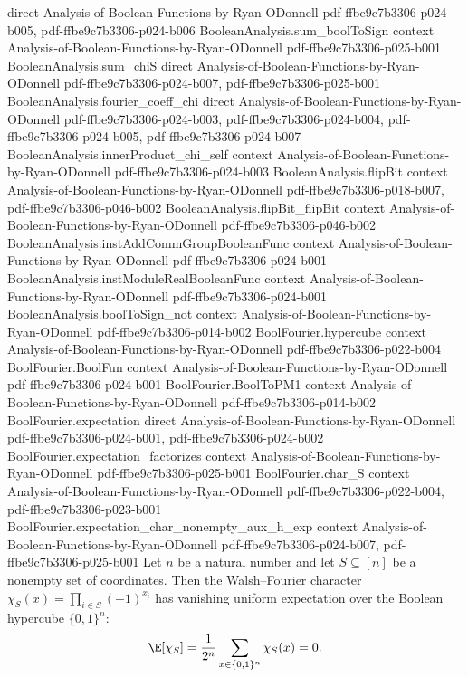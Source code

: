 \begin{lemma}
  {direct}
  {Analysis-of-Boolean-Functions-by-Ryan-ODonnell}
  {pdf-ffbe9c7b3306-p024-b005,
    pdf-ffbe9c7b3306-p024-b006}
\proofstep
  {BooleanAnalysis.sum_boolToSign}
  {context}
  {Analysis-of-Boolean-Functions-by-Ryan-ODonnell}
  {pdf-ffbe9c7b3306-p025-b001}
\proofstep
  {BooleanAnalysis.sum_chiS}
  {direct}
  {Analysis-of-Boolean-Functions-by-Ryan-ODonnell}
  {pdf-ffbe9c7b3306-p024-b007,
    pdf-ffbe9c7b3306-p025-b001}
\proofstep
  {BooleanAnalysis.fourier_coeff_chi}
  {direct}
  {Analysis-of-Boolean-Functions-by-Ryan-ODonnell}
  {pdf-ffbe9c7b3306-p024-b003,
    pdf-ffbe9c7b3306-p024-b004,
    pdf-ffbe9c7b3306-p024-b005,
    pdf-ffbe9c7b3306-p024-b007}
\proofstep
  {BooleanAnalysis.innerProduct_chi_self}
  {context}
  {Analysis-of-Boolean-Functions-by-Ryan-ODonnell}
  {pdf-ffbe9c7b3306-p024-b003}
\proofstep
  {BooleanAnalysis.flipBit}
  {context}
  {Analysis-of-Boolean-Functions-by-Ryan-ODonnell}
  {pdf-ffbe9c7b3306-p018-b007,
    pdf-ffbe9c7b3306-p046-b002}
\proofstep
  {BooleanAnalysis.flipBit_flipBit}
  {context}
  {Analysis-of-Boolean-Functions-by-Ryan-ODonnell}
  {pdf-ffbe9c7b3306-p046-b002}
\proofstep
  {BooleanAnalysis.instAddCommGroupBooleanFunc}
  {context}
  {Analysis-of-Boolean-Functions-by-Ryan-ODonnell}
  {pdf-ffbe9c7b3306-p024-b001}
\proofstep
  {BooleanAnalysis.instModuleRealBooleanFunc}
  {context}
  {Analysis-of-Boolean-Functions-by-Ryan-ODonnell}
  {pdf-ffbe9c7b3306-p024-b001}
\proofstep
  {BooleanAnalysis.boolToSign_not}
  {context}
  {Analysis-of-Boolean-Functions-by-Ryan-ODonnell}
  {pdf-ffbe9c7b3306-p014-b002}
\proofstep
  {BoolFourier.hypercube}
  {context}
  {Analysis-of-Boolean-Functions-by-Ryan-ODonnell}
  {pdf-ffbe9c7b3306-p022-b004}
\proofstep
  {BoolFourier.BoolFun}
  {context}
  {Analysis-of-Boolean-Functions-by-Ryan-ODonnell}
  {pdf-ffbe9c7b3306-p024-b001}
\proofstep
  {BoolFourier.BoolToPM1}
  {context}
  {Analysis-of-Boolean-Functions-by-Ryan-ODonnell}
  {pdf-ffbe9c7b3306-p014-b002}
\proofstep
  {BoolFourier.expectation}
  {direct}
  {Analysis-of-Boolean-Functions-by-Ryan-ODonnell}
  {pdf-ffbe9c7b3306-p024-b001,
    pdf-ffbe9c7b3306-p024-b002}
\proofstep
  {BoolFourier.expectation_factorizes}
  {context}
  {Analysis-of-Boolean-Functions-by-Ryan-ODonnell}
  {pdf-ffbe9c7b3306-p025-b001}
\proofstep
  {BoolFourier.char_S}
  {context}
  {Analysis-of-Boolean-Functions-by-Ryan-ODonnell}
  {pdf-ffbe9c7b3306-p022-b004,
    pdf-ffbe9c7b3306-p023-b001}
\proofstep
  {BoolFourier.expectation_char_nonempty_aux_h_exp}
  {context}
  {Analysis-of-Boolean-Functions-by-Ryan-ODonnell}
  {pdf-ffbe9c7b3306-p024-b007,
    pdf-ffbe9c7b3306-p025-b001}
Let $n$ be a natural number and let $S \subseteq [n]$ be a nonempty set of coordinates.
Then the Walsh--Fourier character $\chi_S(x) = \prod_{i \in S}(-1)^{x_i}$ has vanishing
uniform expectation over the Boolean hypercube $\{0,1\}^n$:
\[
  \E[\chi_S] = \frac{1}{2^n}\sum_{x \in \{0,1\}^n} \chi_S(x) = 0.
\]
\end{lemma}

